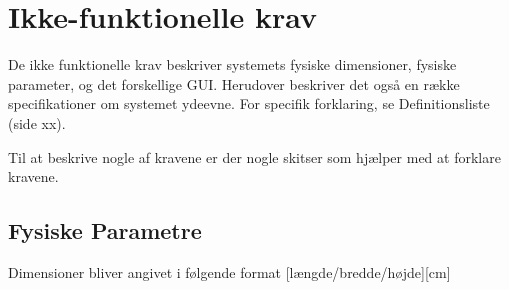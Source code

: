 \documentclass[Kravspecifikation/Kravspec_Main.tex]{subfiles}
\begin{document}
\section{Ikke-funktionelle krav}
De ikke funktionelle krav beskriver systemets fysiske dimensioner, fysiske parameter, og det forskellige GUI. Herudover beskriver det også en række specifikationer om systemet ydeevne. For specifik forklaring, se Definitionsliste (side xx).

Til at beskrive nogle af kravene er der nogle skitser som hjælper med at forklare kravene. 

\subsection{Fysiske Parametre}
Dimensioner bliver angivet i følgende format [længde/bredde/højde][cm]
\end{document}
